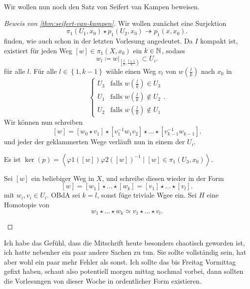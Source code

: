Wir wollen nun noch den Satz von Seifert van Kampen beweisen.
\begin{proof}[Beweis von \autoref{thm:seifert-van-kampen}]
    Wir wollen zunächst eine Surjektion
    \[
        \pi_1(U_1,x_0) \star p_1(U_2,x_0) \twoheadrightarrow p_1(x,x_0)
    .\] 
    finden, wie auch schon in der letzten Vorlesung angedeutet. Da $I$ kompakt ist, existiert  für jeden Weg $[w] \in \pi_1(X,x_0)$ ein $k\in \mathbb{N}$, sodass
    \[
w_l \coloneqq         w|_{\left[ \frac{l}{k}, \frac{l+1}{k} \right) } \subset U_i
    .\] 
    für alle $l$. Für alle  $l\in \left \{1,k-1\right\}$ wähle einen Weg $v_l$ von  $w\left( \frac{l}{k} \right) $ nach $x_0$ in 
    \[
    \begin{cases}
        U_3 & \text{falls } w\left( \frac{l}{k} \right) \in U_3 \\
        U_1 & \text{falls } w\left( \frac{l}{k} \right) \not\in U_2 \\
        U_2 & \text{falls } w\left( \frac{l}{k} \right)  \not\in U_1
    \end{cases}
    .\] 
    Wir können nun schreiben
    \[
        [w] = [w_0\star v_1] \star [v_1^{-1} w_1 v_2] \star \ldots \star [v_{k-1}^{-1}w_{k-1}]
    .\] 
    und jeder der geklammerten Wege verläuft nun in einem der $U_i$.
\begin{claim}
    Es ist $\ker(p) = \left< \varphi 1([w])\varphi 2([w])^{-1} \mid  [w] \in \pi_1(U_3,x_0) \right> $.
\end{claim}
\begin{subproof}
    Sei $[w]$ ein beliebiger Weg in  $X$, und schreibe diesen wieder in der Form
     \[
         [w] = [w_1] \star \ldots \star [w_k] = [v_1] \star \ldots \star [v_l]
    .\] 
    mit $w_i, v_i \in U_i$. OBdA sei $k=l$, sonst füge triviale Wgee ein. Sei  $H$ eine Homotopie von 
     \[
    w_1 \star \ldots \star w_k \simeq v_1 \star \ldots \star v_l
    .\] 
\end{subproof}
\end{proof}


\begin{remark}
    Ich habe das Gefühl, dass die Mitschrift heute besonders chaotisch geworden ist, ich hatte nebenher ein paar andere Sachen zu tun. Sie sollte vollständig sein, hat aber wohl ein paar mehr Fehler als sonst. Ich sollte das bis Freitag Vormittag gefixt haben, schaut also potentiell morgen mittag nochmal vorbei, dann sollten die Vorlesungen von dieser Woche in ordentlicher Form existieren.
\end{remark}
